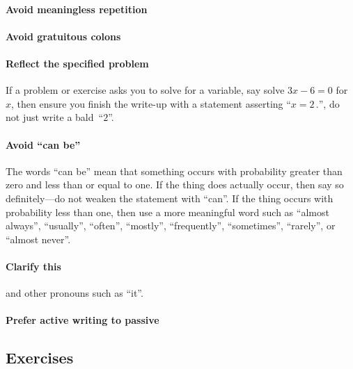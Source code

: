 \begin{draft}
\paragraph{Avoid meaningless repetition}



\paragraph{Avoid gratuitous colons}



\paragraph{Reflect the specified problem}
If a problem or exercise asks you to solve for a variable, say solve  \(3x-6=0\) for~\(x\), then ensure you finish the write-up with a statement asserting ``\(x=2\,.\)'', do not just write a bald~``\(2\)''.



\paragraph{Avoid ``can be''}
The words ``can be'' mean that something occurs with probability greater than zero and less than or equal to one.
If the thing does actually occur, then say so definitely---do not weaken the statement with ``can''.
If the thing occurs with probability less than one, then use a more meaningful word such as ``almost always'', ``usually'', ``often'', ``mostly'', ``frequently'', ``sometimes'', ``rarely'',  or ``almost never''.



\paragraph{Clarify this}
and other pronouns such as ``it''.




\paragraph{Prefer active writing to passive}








\subsection{Exercises}


\end{draft}
